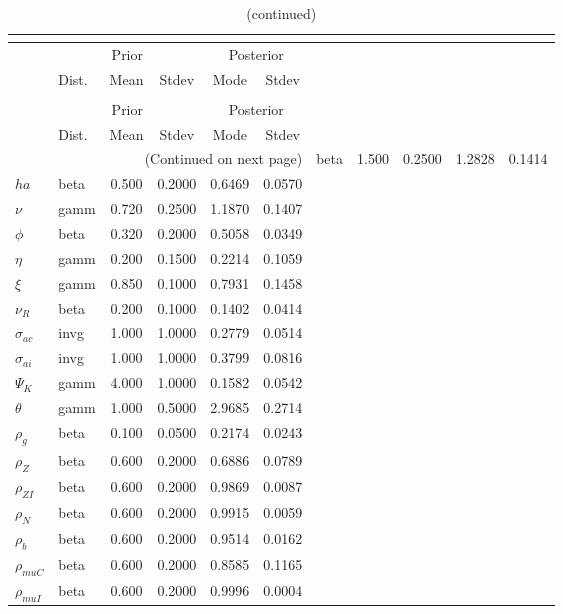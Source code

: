  
\begin{center}
\begin{longtable}{llcccc} 
\caption{Results from posterior maximization (parameters)}\\
 \label{Table:Posterior:1}\\
\toprule 
  & \multicolumn{3}{c}{Prior}  &  \multicolumn{2}{c}{Posterior} \\
  \cmidrule(r{.75em}){2-4} \cmidrule(r{.75em}){5-6}
  & Dist. & Mean  & Stdev & Mode & Stdev \\ 
\midrule \endfirsthead 
\caption{(continued)}\\
 \bottomrule 
  & \multicolumn{3}{c}{Prior}  &  \multicolumn{2}{c}{Posterior} \\
  \cmidrule(r{.75em}){2-4} \cmidrule(r{.75em}){5-6}
  & Dist. & Mean  & Stdev & Mode & Stdev \\ 
\midrule \endhead 
\bottomrule \multicolumn{6}{r}{(Continued on next page)}\endfoot 
\bottomrule\endlastfoot 
${\sigma}$ & beta &   1.500 & 0.2500 &   1.2828 &  0.1414 \\ 
${ha}$ & beta &   0.500 & 0.2000 &   0.6469 &  0.0570 \\ 
$\nu$ & gamm &   0.720 & 0.2500 &   1.1870 &  0.1407 \\ 
${\phi}$ & beta &   0.320 & 0.2000 &   0.5058 &  0.0349 \\ 
${\eta}$ & gamm &   0.200 & 0.1500 &   0.2214 &  0.1059 \\ 
$\xi$ & gamm &   0.850 & 0.1000 &   0.7931 &  0.1458 \\ 
${\nu_R}$ & beta &   0.200 & 0.1000 &   0.1402 &  0.0414 \\ 
${\sigma_{ac}}$ & invg &   1.000 & 1.0000 &   0.2779 &  0.0514 \\ 
${\sigma_{ai}}$ & invg &   1.000 & 1.0000 &   0.3799 &  0.0816 \\ 
${\Psi_{K}}$ & gamm &   4.000 & 1.0000 &   0.1582 &  0.0542 \\ 
${\theta}$ & gamm &   1.000 & 0.5000 &   2.9685 &  0.2714 \\ 
${\rho_g}$ & beta &   0.100 & 0.0500 &   0.2174 &  0.0243 \\ 
${\rho_Z}$ & beta &   0.600 & 0.2000 &   0.6886 &  0.0789 \\ 
${\rho_{ZI}}$ & beta &   0.600 & 0.2000 &   0.9869 &  0.0087 \\ 
${\rho_N}$ & beta &   0.600 & 0.2000 &   0.9915 &  0.0059 \\ 
${\rho_b}$ & beta &   0.600 & 0.2000 &   0.9514 &  0.0162 \\ 
${\rho_{muC}}$ & beta &   0.600 & 0.2000 &   0.8585 &  0.1165 \\ 
${\rho_{muI}}$ & beta &   0.600 & 0.2000 &   0.9996 &  0.0004 \\ 
\end{longtable}
 \end{center}

